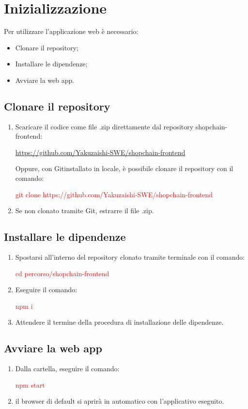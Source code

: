 \section{Inizializzazione}\label{section:inizializzazione}

Per utilizzare l’applicazione web è necessario:
\begin{itemize}
    \item Clonare il repository;
    \item Installare le dipendenze;
    \item Avviare la web app.
\end{itemize}


\subsection{Clonare il repository}

\begin{enumerate}
    \item Scaricare il codice come file .zip direttamente dal repository shopchain-frontend:
            \begin{center}
                \href{https://github.com/Yakuzaishi-SWE/shopchain-frontend}{https://github.com/Yakuzaishi-SWE/shopchain-frontend}
            \end{center}
            Oppure, con Git\glo installato in locale, è possibile clonare il repository con il comando:
            \begin{center}
                \textcolor{red}{git clone https://github.com/Yakuzaishi-SWE/shopchain-frontend}
            \end{center}
    \item Se non clonato tramite Git, estrarre il file .zip.
\end{enumerate}

\subsection{Installare le dipendenze}

\begin{enumerate}
    \item Spostarsi all'interno del repository clonato tramite terminale con il comando:
    \begin{center}
        \textcolor{red}{cd percorso/shopchain-frontend}
    \end{center}
    \item Eseguire il comando:
    \begin{center}
        \textcolor{red}{npm i}
    \end{center}
    \item Attendere il termine della procedura di installazione delle dipendenze.
\end{enumerate}

\subsection{Avviare la web app}

\begin{enumerate}
    \item Dalla cartella, eseguire il comando:
    \begin{center}
        \textcolor{red}{npm start}
    \end{center}
    \item il browser di default si aprirà in automatico con l'applicativo eseguito.
\end{enumerate}